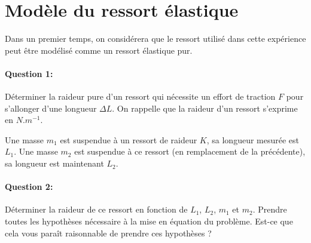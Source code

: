 


\legendeniveaux

\section{Modèle du ressort élastique} 

Dans un premier temps, on considérera que le ressort utilisé dans cette expérience peut être modélisé comme un ressort élastique pur. 

\paragraph{Question 1:} Déterminer la raideur pure d'un ressort qui nécessite un effort de traction $F$ pour s'allonger d'une longueur $\Delta L$. On rappelle que la raideur d'un ressort s'exprime en $N.m^{-1}$.



Une masse $m_1$ est suspendue à un ressort de raideur $K$, sa longueur mesurée est $L_1$. Une masse $m_2$ est suspendue à ce ressort (en remplacement de la précédente), sa longueur est maintenant $L_2$.

\paragraph{Question 2:} Déterminer la raideur de ce ressort en fonction de $L_1$, $L_2$, $m_1$ et $m_2$. Prendre toutes les hypothèses nécessaire à la mise en équation du problème. Est-ce que cela vous paraît raisonnable de prendre ces hypothèses ?


